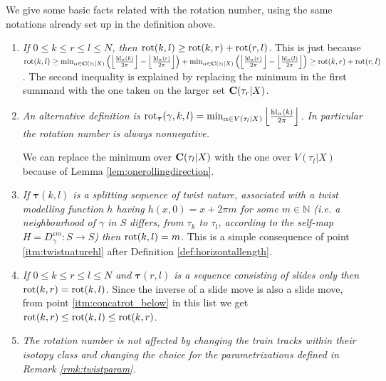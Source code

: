 \begin{rmk}\label{rmk:rotbasics}
We give some basic facts related with the rotation number, using the same notations already set up in the definition above. 

\begin{enumerate}
\item \label{itm:concatrot_below} \textit{If $0\leq k\leq r\leq l\leq N$, then $\mathrm{rot}(k,l)\geq\mathrm{rot}(k,r)+\mathrm{rot}(r,l)$.}
This is just because $\rot(k,l)\geq \min_{\alpha\in\cc(\tau_l|X)}\left(\left\lfloor\frac{\hl_\alpha(k)}{2\pi}\right\rfloor-\left\lfloor\frac{\hl_\alpha(r)}{2\pi}\right\rfloor\right) + \min_{\alpha\in\cc(\tau_l|X)}\left(\left\lfloor\frac{\hl_\alpha(r)}{2\pi}\right\rfloor-\left\lfloor\frac{\hl_\alpha(l)}{2\pi}\right\rfloor\right)\linebreak \geq \rot(k,r)+\rot(r,l)$. The second inequality is explained by replacing the minimum in the first summand with the one taken on the larger set $\mathbf C(\tau_r|X)$.

\item\label{itm:rotwithvertexonly} \textit{An alternative definition is $\mathrm{rot}_{\bm\tau}(\gamma,k,l)= \min_{\alpha\in V(\tau_l|X)}\left\lfloor\frac{\mathrm{hl}_\alpha(k)}{2\pi}\right\rfloor$. In particular the rotation number is always nonnegative.}

We can replace the minimum over $\mathbf C(\tau_l|X)$ with the one over $V(\tau_l|X)$ because of Lemma \ref{lem:onerollingdirection}.

\item \label{itm:rotofdehn} \textit{If $\bm\tau(k,l)$ is a splitting sequence of twist nature, associated with a twist modelling function $h$ having $h(x,0)=x+2\pi m$ for some $m\in\mathbb N$ (i.e. a neighbourhood of $\gamma$ in $S$ differs, from $\tau_k$ to $\tau_l$, according to the self-map $H=D_\gamma^{\epsilon m}:S\rightarrow S$) then $\mathrm{rot}(k,l)=m$.} This is a simple consequence of point \ref{itm:twistnaturehl} after Definition \ref{def:horizontallength}.

\item \textit{If $0\leq k\leq r\leq l\leq N$ and $\bm\tau(r,l)$ is a sequence consisting of slides only then $\mathrm{rot}(k,r)=\mathrm{rot}(k,l)$.} Since the inverse of a slide move is also a slide move, from point \ref{itm:concatrot_below} in this list we get $\mathrm{rot}(k,r)\leq\mathrm{rot}(k,l)\leq \mathrm{rot}(k,r)$.

\item \textit{The rotation number is not affected by changing the train tracks within their isotopy class and changing the choice for the parametrizations defined in Remark \ref{rmk:twistparam}.}


\end{enumerate}
\end{rmk}

